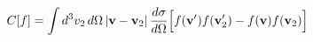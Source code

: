 \documentclass[preview]{standalone}
\begin{document}
\begin{align*}
\special{dvisvgm:raw <g id='unique000'>}C[f]=\int d^3v_2\,d\Omega\,|\va v-\va v_2|\,\frac{d\sigma}{d\Omega}\Big[f(\va v')f(\va v_2')-f(\va v)f(\va v_2)\Big]\special{dvisvgm:raw </g>}
\end{align*}
\end{document}
